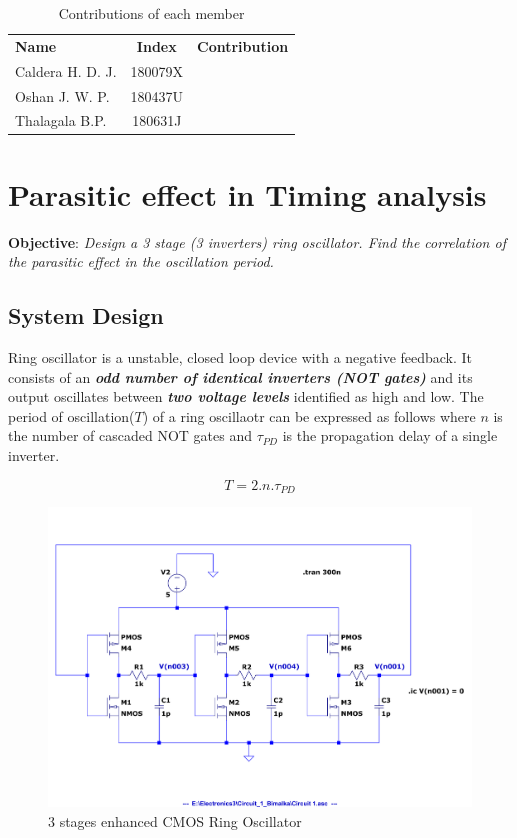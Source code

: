 \documentclass[a4paper,11pt]{article}%
\begin{document}

\pagebreak

\begin{table}[H]
		\centering
		\begin{tabular}{l c l}
		\textbf{Name} & \textbf{Index} & \textbf{Contribution}\\

	Caldera H. D. J. &  180079X& \\
	Oshan J. W. P.    & 180437U& \\
	Thalagala B.P. & 180631J & \\


		\end{tabular}
		\caption{Contributions of each member}
\end{table}


\tableofcontents

\pagebreak
\section{Parasitic effect in Timing analysis}
\textbf{Objective}: \textit{Design a 3 stage (3 inverters) ring oscillator. Find the correlation of the parasitic effect in the oscillation period.}\\

\subsection{System Design}
Ring oscillator is a unstable, closed loop device with a negative feedback. It consists of an \textbf{\textit{odd number of identical inverters (NOT gates)}} and its output oscillates between\textbf{\textit{ two voltage levels}} identified as high and low. The period of oscillation($T$) of a ring oscillaotr can be expressed as follows where $n$ is the number of cascaded NOT gates and $\tau_{PD}$ is the propagation delay of a single inverter.

\[
T = 2.n.\tau_{PD}
\]


\begin{figure}[H]
\centering
\includegraphics[scale=0.6]{figures/cct1plot2}
\caption{3 stages enhanced CMOS Ring Oscillator}
\end{figure}
\end{document}
